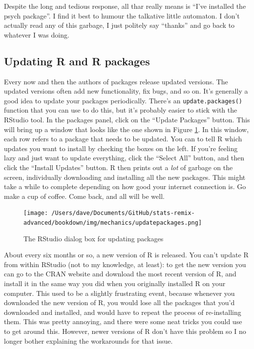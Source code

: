 \documentclass[
]{book}
\begin{document}
Despite the long and tedious response, all thar really means is ``I've installed the psych package''. I find it best to humour the talkative little automaton. I don't actually read any of this garbage, I just politely say ``thanks'' and go back to whatever I was doing.

\hypertarget{updating-r-and-r-packages}{%
\subsection{Updating R and R packages}\label{updating-r-and-r-packages}}

Every now and then the authors of packages release updated versions. The updated versions often add new functionality, fix bugs, and so on. It's generally a good idea to update your packages periodically. There's an \texttt{update.packages()} function that you can use to do this, but it's probably easier to stick with the RStudio tool. In the packages panel, click on the ``Update Packages'' button. This will bring up a window that looks like the one shown in Figure \ref{fig:updatepackages}. In this window, each row refers to a package that needs to be updated. You can to tell R which updates you want to install by checking the boxes on the left. If you're feeling lazy and just want to update everything, click the ``Select All'' button, and then click the ``Install Updates'' button. R then prints out a \emph{lot} of garbage on the screen, individually downloading and installing all the new packages. This might take a while to complete depending on how good your internet connection is. Go make a cup of coffee. Come back, and all will be well.

\begin{figure}
\centering
\texttt{[image: /Users/dave/Documents/GitHub/stats-remix-advanced/bookdown/img/mechanics/updatepackages.png]}
\caption{\label{fig:updatepackages}The RStudio dialog box for updating packages}
\end{figure}

About every six months or so, a new version of R is released. You can't update R from within RStudio (not to my knowledge, at least): to get the new version you can go to the CRAN website and download the most recent version of R, and install it in the same way you did when you originally installed R on your computer. This used to be a slightly frustrating event, because whenever you downloaded the new version of R, you would lose all the packages that you'd downloaded and installed, and would have to repeat the process of re-installing them. This was pretty annoying, and there were some neat tricks you could use to get around this. However, newer versions of R don't have this problem so I no longer bother explaining the workarounds for that issue.
\end{document}
